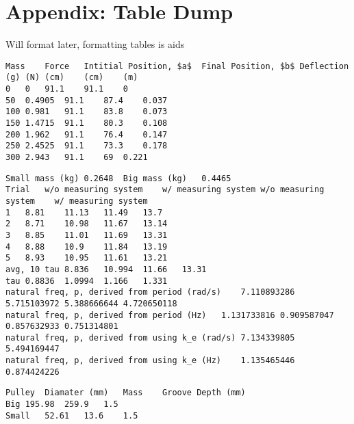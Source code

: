 \section{Appendix: Table Dump}
Will format later, formatting tables is aids \\
\begin{verbatim}
Mass	Force	Intitial Position, $a$	Final Position, $b$	Deflection
(g)	(N)	(cm)	(cm)	(m)
0	0	91.1	91.1	0
50	0.4905	91.1	87.4	0.037
100	0.981	91.1	83.8	0.073
150	1.4715	91.1	80.3	0.108
200	1.962	91.1	76.4	0.147
250	2.4525	91.1	73.3	0.178
300	2.943	91.1	69	0.221
\end{verbatim}
\begin{verbatim}
Small mass (kg)	0.2648	Big mass (kg)	0.4465
Trial	w/o measuring system	w/ measuring system	w/o measuring system	w/ measuring system
1	8.81	11.13	11.49	13.7
2	8.71	10.98	11.67	13.14
3	8.85	11.01	11.69	13.31
4	8.88	10.9	11.84	13.19
5	8.93	10.95	11.61	13.21
avg, 10 tau	8.836	10.994	11.66	13.31
tau	0.8836	1.0994	1.166	1.331
natural freq, p, derived from period (rad/s)	7.110893286	5.715103972	5.388666644	4.720650118
natural freq, p, derived from period (Hz)	1.131733816	0.909587047	0.857632933	0.751314801
natural freq, p, derived from using k_e (rad/s)	7.134339805		5.494169447	
natural freq, p, derived from using k_e (Hz)	1.135465446		0.874424226	
\end{verbatim}
\begin{verbatim}
Pulley	Diamater (mm)	Mass	Groove Depth (mm)
Big	195.98	259.9	1.5
Small	52.61	13.6	1.5
\end{verbatim}
